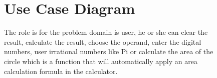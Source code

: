 \documentclass[12pt]{report}
\begin{document}
{\begin{figure}[h!]
	\end{figure}
	

	


	\begin{figure}[h!]
	\section{Use Case Diagram}
	
	\begin{itemize}
	The role is for the problem domain is user, he or she can clear the result, calculate the result, choose the operand, enter the digital numbers, user irrational numbers like Pi or calculate the area of the circle which is a function that will automatically apply an area calculation formula in the calculator.


\end{itemize}
\end{figure}}
\end{document}
